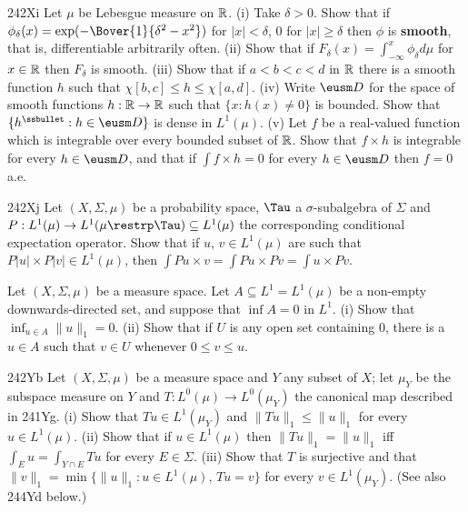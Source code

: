 {\spheader 242Xi Let $\mu$ be Lebesgue measure on $\Bbb R$.   (i) Take
$\delta>0$.   Show
that if $\phi_{\delta}(x)=\exp(-\Bover{1}{\delta^2-x^2})$ for
$|x|<\delta$, $0$ for $|x|\ge\delta$ then $\phi$ is {\bf smooth}, that
is, differentiable arbitrarily often.   (ii) Show that if
$F_{\delta}(x)=\int_{-\infty}^x\phi_{\delta}d\mu$ for $x\in\Bbb R$
then
$F_{\delta}$ is smooth.   (iii) Show that if $a<b<c<d$ in $\Bbb R$
there is a smooth function $h$ such that $\chi[b,c]\le
h\le\chi[a,d]$.   (iv) Write $\eusm D$ for the space of smooth
functions $h:\Bbb R\to\Bbb R$ such that $\{x:h(x)\ne 0\}$ is bounded.
  Show that
$\{h^{\ssbullet}:h\in\eusm D\}$ is dense in $L^1(\mu)$.
(v) Let $f$ be a real-valued function which is integrable over every
bounded subset of $\Bbb R$.   Show that $f\times h$ is integrable for
every $h\in\eusm D$, and that if $\int f\times h=0$ for every
$h\in\eusm D$ then $f=0$ a.e.   

\spheader 242Xj Let $(X,\Sigma,\mu)$ be a probability space,
$\Tau$ a $\sigma$-subalgebra of $\Sigma$ and
$P:L^1(\mu)\to L^1(\mu\restrp\Tau)\subseteq L^1(\mu)$
the corresponding conditional expectation operator.   Show that if
$u$, $v\in L^1(\mu)$ are such that $P|u|\times P|v|\in L^1(\mu)$, then
$\int Pu\times v=\int Pu\times Pv=\int u\times Pv$.

Let $(X,\Sigma,\mu)$ be a measure space.   Let $A\subseteq
L^1=L^1(\mu)$
be a non-empty downwards-directed set, and
suppose that $\inf A=0$ in $L^1$.   (i) Show that
$\inf_{u\in A}\|u\|_1=0$.
   (ii)
Show
that if $U$ is any open set containing $0$, there is a $u\in A$ such
that $v\in U$ whenever $0\le v\le u$.

\spheader 242Yb Let $(X,\Sigma,\mu)$ be a measure space and $Y$
any subset of $X$;  let $\mu_Y$ be the subspace measure on $Y$ and
$T:L^0(\mu)\to L^0(\mu_Y)$ the canonical map described in 241Yg.   (i)
Show that $Tu\in L^1(\mu_Y)$ and $\|Tu\|_1\le\|u\|_1$ for every
$u\in L^1(\mu)$.   (ii) Show that if $u\in L^1(\mu)$ then
$\|Tu\|_1=\|u\|_1$
iff $\int_Eu=\int_{Y\cap E}Tu$ for every $E\in\Sigma$.  (iii) Show
that $T$ is surjective and that
$\|v\|_1=\min\{\|u\|_1:u\in L^1(\mu),\,Tu=v\}$ for every
$v\in L^1(\mu_Y)$.     (See also 244Yd below.)

}
